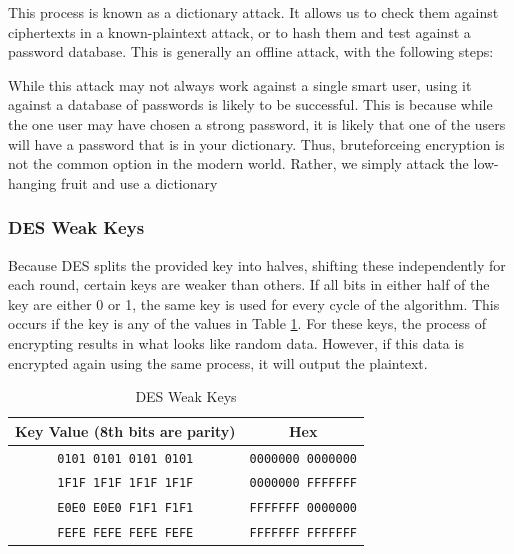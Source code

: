 				This process is known as a dictionary attack. 
				It allows us to check them against ciphertexts in a known-plaintext attack, or to hash them and test against a password database. 
				This is generally an offline attack, with the following steps:
				
				While this attack may not always work against a single smart user, using it against a database of passwords is likely to be successful. 
				This is because while the one user may have chosen a strong password, it is likely that one of the users will have a password that is in your dictionary. 
				Thus, bruteforceing encryption is not the common option in the modern world. 
				Rather, we simply attack the low-hanging fruit and use a dictionary
			\subsubsection{DES Weak Keys}
				Because DES splits the provided key into halves, shifting these independently for each round, certain keys are weaker than others. 
				If all bits in either half of the key are either 0 or 1, the same key is used for every cycle of the algorithm. 
				This occurs if the key is any of the values in Table \ref{tab:DESWeakKeys}. 
				For these keys, the process of encrypting results in what looks like random data. 
				However, if this data is encrypted again using the same process, it will output the plaintext. 
				\begin{table}[htb]
					\centering
					\begin{tabular}{|c|c|}
						\hline
						\textbf{Key Value} (8th bits are parity) & \textbf{Hex} \\ \hline
						\texttt{0101 0101 0101 0101} & \texttt{0000000 0000000} \\ \hline
						\texttt{1F1F 1F1F 1F1F 1F1F} & \texttt{0000000 FFFFFFF} \\ \hline
						\texttt{E0E0 E0E0 F1F1 F1F1} & \texttt{FFFFFFF 0000000} \\ \hline
						\texttt{FEFE FEFE FEFE FEFE} & \texttt{FFFFFFF FFFFFFF} \\ \hline
					\end{tabular}
					\caption{DES Weak Keys}
					\label{tab:DESWeakKeys}
				\end{table}

